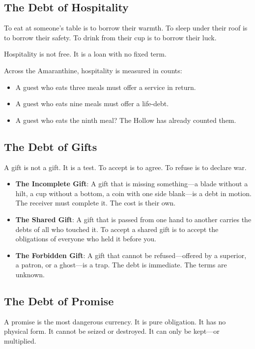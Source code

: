 \documentclass[12pt,oneside]{book}
\begin{document}
\subsection{The Debt of Hospitality}

To eat at someone's table is to borrow their warmth. To sleep under their roof is to borrow their safety. To drink from their cup is to borrow their luck.

Hospitality is not free. It is a loan with no fixed term.

Across the Amaranthine, hospitality is measured in counts:
\begin{itemize}
\item A guest who eats three meals must offer a service in return.
\item A guest who eats nine meals must offer a life-debt.
\item A guest who eats the ninth meal? The Hollow has already counted them.
\end{itemize}

\subsection{The Debt of Gifts}

A gift is not a gift. It is a test. To accept is to agree. To refuse is to declare war.

\begin{itemize}
\item \textbf{The Incomplete Gift}: A gift that is missing something---a blade without a hilt, a cup without a bottom, a coin with one side blank---is a debt in motion. The receiver must complete it. The cost is their own.
\item \textbf{The Shared Gift}: A gift that is passed from one hand to another carries the debts of all who touched it. To accept a shared gift is to accept the obligations of everyone who held it before you.
\item \textbf{The Forbidden Gift}: A gift that cannot be refused---offered by a superior, a patron, or a ghost---is a trap. The debt is immediate. The terms are unknown.
\end{itemize}

\subsection{The Debt of Promise}

A promise is the most dangerous currency. It is pure obligation. It has no physical form. It cannot be seized or destroyed. It can only be kept---or multiplied.
\end{document}
